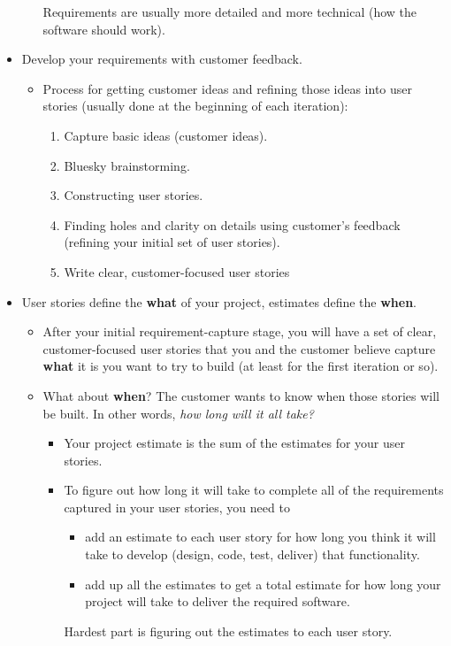 \documentclass[letterpaper]{article}
\begin{document}
\begin{itemize}
\begin{itemize}
\begin{mdframed}
            Requirements are usually more detailed and more technical (how the software should work). 
        \end{mdframed}
    \end{itemize}

    \item Develop your requirements with customer feedback. 
    \begin{itemize}
        \item Process for getting customer ideas and refining those ideas into user stories (usually done at the beginning of each iteration): 
        \begin{enumerate}
            \item Capture basic ideas (customer ideas).
            \item Bluesky brainstorming. 
            \item Constructing user stories. 
            \item Finding holes and clarity on details using customer's feedback (refining your initial set of user stories). 
            \item Write clear, customer-focused user stories
        \end{enumerate}
    \end{itemize}

    \item User stories define the \textbf{what} of your project, estimates define the \textbf{when}. 
    \begin{itemize}
        \item After your initial requirement-capture stage, you will have a set of clear, customer-focused user stories that you and the customer believe capture \textbf{what} it is you want to try to build (at least for the first iteration or so). 
        \item What about \textbf{when}? The customer wants to know when those stories will be built. In other words, \emph{how long will it all take?}
        \begin{itemize}
            \item Your project estimate is the sum of the estimates for your user stories. 
            \item To figure out how long it will take to complete all of the requirements captured in your user stories, you need to 
            \begin{itemize}
                \item add an estimate to each user story for how long you think it will take to develop (design, code, test, deliver) that functionality. 
                \item add up all the estimates to get a total estimate for how long your project will take to deliver the required software. 
            \end{itemize}
            Hardest part is figuring out the estimates to each user story. 


\end{itemize}
\end{itemize}
\end{itemize}
\end{document}
